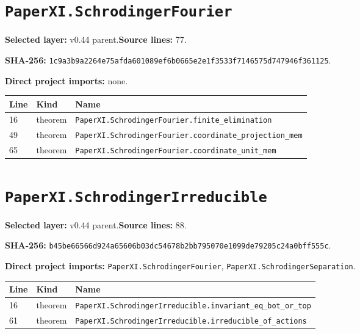 \documentclass[10pt,oneside]{book}
\begin{document}
\section{\texorpdfstring{\nolinkurl{PaperXI.SchrodingerFourier}}{PaperXI.SchrodingerFourier}}\label{module:PaperXI.SchrodingerFourier}

\textbf{Selected layer:} v0.44 parent.\quad\textbf{Source lines:} 77.\par\textbf{SHA-256:} {\scriptsize\nolinkurl{1c9a3b9a2264e75afda601089ef6b0665e2e1f3533f7146575d747946f361125}}.


\textbf{Direct project imports:} none.

\begin{longtable}{@{}p{}p{}p{}@{}}\toprule Line&Kind&Name\\\midrule\endhead

16&theorem&\nolinkurl{PaperXI.SchrodingerFourier.finite_elimination}\\

49&theorem&\nolinkurl{PaperXI.SchrodingerFourier.coordinate_projection_mem}\\

65&theorem&\nolinkurl{PaperXI.SchrodingerFourier.coordinate_unit_mem}\\

\bottomrule\end{longtable}

\section{\texorpdfstring{\nolinkurl{PaperXI.SchrodingerIrreducible}}{PaperXI.SchrodingerIrreducible}}\label{module:PaperXI.SchrodingerIrreducible}

\textbf{Selected layer:} v0.44 parent.\quad\textbf{Source lines:} 88.\par\textbf{SHA-256:} {\scriptsize\nolinkurl{b45be66566d924a65606b03dc54678b2bb795070e1099de79205c24a0bff555c}}.


\textbf{Direct project imports:} \nolinkurl{PaperXI.SchrodingerFourier}, \nolinkurl{PaperXI.SchrodingerSeparation}.

\begin{longtable}{@{}p{}p{}p{}@{}}\toprule Line&Kind&Name\\\midrule\endhead

16&theorem&\nolinkurl{PaperXI.SchrodingerIrreducible.invariant_eq_bot_or_top}\\

61&theorem&\nolinkurl{PaperXI.SchrodingerIrreducible.irreducible_of_actions}\\

\bottomrule\end{longtable}
\end{document}
